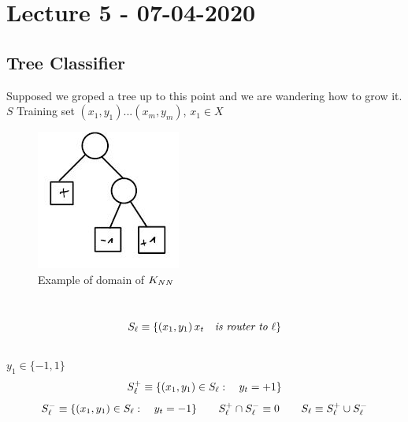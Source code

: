 \documentclass[../main.tex]{subfiles}
\begin{document}
\chapter{Lecture 5 - 07-04-2020}

\section{Tree Classifier}

Supposed we groped a tree up to this point and we are wandering how to
grow it.
\\
$S$ Training set $(x_1,y_1)...(x_m,y_m)$, $x_1 \in X$
\\
\begin{figure}[h]
    \centering
    \includegraphics[width=0.4\linewidth]{../img/lez5-img1.JPG}
    \caption{Example of domain of $K_{NN}$}
\end{figure}
\\
$$
S_{\ell} \equiv \{(x_1,y_1) \, x_t \quad \textit{is router to } \ell \}
$$
\\
$y_1 \in \{-1,1\}$
\\
$$
S_{\ell} ^+ \equiv \{(x_1,y_1) \in S_{\ell} : \quad y_t = +1 \} 
$$
$$
S_{\ell}^- \equiv \{(x_1,y_1) \in S_{\ell} : \quad  y_t = -1 \} 
\qquad
S_{\ell}^+ \cap S_{\ell}^- \equiv 0 \qquad S_{\ell} \equiv S_{\ell}^+ \cup S_{\ell}^-
$$
\end{document}
